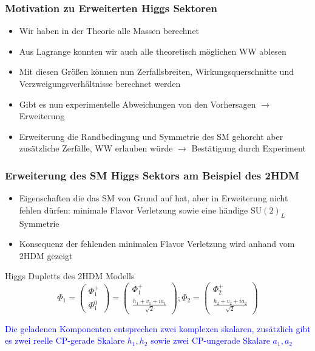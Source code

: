 \documentclass[xcolor=dvipsnames]{beamer}
\begin{document}
\begin{frame}
\frametitle{Motivation zu Erweiterten Higgs Sektoren}
\begin{itemize}
\item Wir haben in der Theorie alle Massen berechnet 
\item Aus Lagrange konnten wir auch alle theoretisch möglichen WW ablesen 
\item Mit diesen Größen können nun Zerfallsbreiten, Wirkungsquerschnitte und Verzweigungsverhältnisse berechnet werden
\item Gibt es nun experimentelle Abweichungen von den Vorhersagen $\rightarrow$ Erweiterung
\item Erweiterung die Randbedingung und Symmetrie des SM gehorcht aber zusätzliche Zerfälle, WW erlauben würde $\rightarrow$ Bestätigung durch Experiment 
\end{itemize}
\end{frame}


\begin{frame}
\frametitle{Erweiterung des SM Higgs Sektors am Beispiel des 2HDM}
\begin{itemize}
\item Eigenschaften die das SM von Grund auf hat, aber in Erweiterung nicht fehlen dürfen: minimale Flavor Verletzung sowie eine händige $\text{SU}(2)_L$ Symmetrie
\item  Konsequenz der fehlenden minimalen Flavor Verletzung wird anhand vom 2HDM gezeigt
\end{itemize}
\begin{block}{Higgs Dupletts des 2HDM Modells }
\begin{equation*}
\Phi_{1}=\left( \begin{array}{c} \Phi^{+}_{1}\\ \Phi^{0}_{1} \end{array}\right)=\left( \begin{array}{c}\Phi^{+}_{1} \\  \frac{h_{1}+v_{1}+ia_{1}}{\sqrt{2}}\end{array}\right) ; \Phi_{2}=\left( \begin{array}{c}\Phi^{+}_{2} \\  \frac{h_{2}+v_{2}+ia_{2}}{\sqrt{2}} \end{array}\right) 
\end{equation*}
\end{block}
\textcolor{Blue}{Die geladenen Komponenten entsprechen zwei komplexen skalaren, zusätzlich gibt es zwei reelle CP-gerade Skalare $h_{1},h_{2}$ sowie zwei CP-ungerade Skalare $a_{1},a_{2}$ \autocite{5}}
\end{frame}
\end{document}
